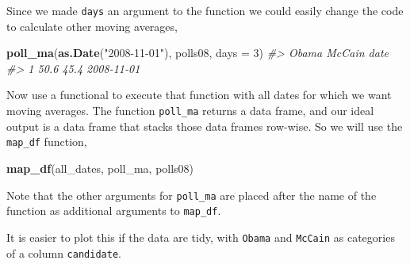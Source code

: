 \documentclass[]{book}
\newenvironment{Shaded}{\begin{snugshade}}{\end{snugshade}}
\newcommand{\CommentTok}[1]{\textcolor[rgb]{0.56,0.35,0.01}{\textit{#1}}}
\newcommand{\DataTypeTok}[1]{\textcolor[rgb]{0.13,0.29,0.53}{#1}}
\newcommand{\DecValTok}[1]{\textcolor[rgb]{0.00,0.00,0.81}{#1}}
\newcommand{\KeywordTok}[1]{\textcolor[rgb]{0.13,0.29,0.53}{\textbf{#1}}}
\newcommand{\NormalTok}[1]{#1}
\newcommand{\OperatorTok}[1]{\textcolor[rgb]{0.81,0.36,0.00}{\textbf{#1}}}
\newcommand{\OtherTok}[1]{\textcolor[rgb]{0.56,0.35,0.01}{#1}}
\newcommand{\StringTok}[1]{\textcolor[rgb]{0.31,0.60,0.02}{#1}}
\theoremstyle{definition}
\theoremstyle{definition}
\theoremstyle{definition}
\theoremstyle{remark}
\begin{document}
Since we made \texttt{days} an argument to the function we could easily
change the code to calculate other moving averages,

\begin{Shaded}
\begin{Highlighting}[]
\KeywordTok{poll_ma}\NormalTok{(}\KeywordTok{as.Date}\NormalTok{(}\StringTok{"2008-11-01"}\NormalTok{), polls08, }\DataTypeTok{days =} \DecValTok{3}\NormalTok{)}
\CommentTok{#>   Obama McCain       date}
\CommentTok{#> 1  50.6   45.4 2008-11-01}
\end{Highlighting}
\end{Shaded}

Now use a functional to execute that function with all dates for which
we want moving averages. The function \texttt{poll\_ma} returns a data
frame, and our ideal output is a data frame that stacks those data
frames row-wise. So we will use the \texttt{map\_df} function,

\begin{Shaded}
\begin{Highlighting}[]
\KeywordTok{map_df}\NormalTok{(all_dates, poll_ma, polls08)}
\end{Highlighting}
\end{Shaded}

Note that the other arguments for \texttt{poll\_ma} are placed after the
name of the function as additional arguments to \texttt{map\_df}.

It is easier to plot this if the data are tidy, with \texttt{Obama} and
\texttt{McCain} as categories of a column \texttt{candidate}.

\begin{Shaded}
\end{Shaded}
\end{document}
